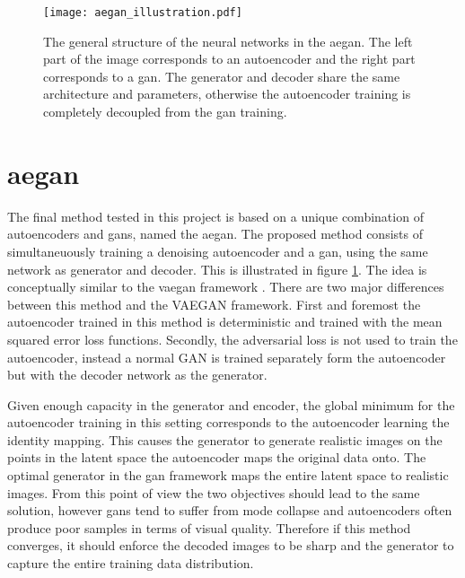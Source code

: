 \begin{figure}[t]
    \centering
    \texttt{[image: aegan\_illustration.pdf]}
    \caption{The general structure of the neural networks in the \acrlong{aegan}. The left part of the image corresponds to an autoencoder and the right part corresponds to a \acrshort{gan}. The generator and decoder share the same architecture and parameters, otherwise the autoencoder training is completely decoupled from the \acrshort{gan} training.}
    \label{fig:aegan}
\end{figure}

\section{\acrlong{aegan}}
The final method tested in this project is based on a unique combination of autoencoders and \acrshort{gans}, named the \acrfull{aegan}. The proposed method consists of simultaneuously training a denoising autoencoder and a \acrshort{gan}, using the same network as generator and decoder. This is illustrated in figure \ref{fig:aegan}. The idea is conceptually similar to the \acrshort{vaegan} framework \parencite{LarsenSW15autoencodingbeyond}. There are two major differences between this method and the VAEGAN framework. First and foremost the autoencoder trained in this method is deterministic and trained with the mean squared error loss functions. Secondly, the adversarial loss is not used to train the autoencoder, instead a normal GAN is trained separately form the autoencoder but with the decoder network as the generator. 

Given enough capacity in the generator and encoder, the global minimum for the autoencoder training in this setting corresponds to the autoencoder learning the identity mapping. This causes the generator to generate realistic images on the points in the latent space the autoencoder maps the original data onto. The optimal generator in the \acrshort{gan} framework maps the entire latent space to realistic images. From this point of view the two objectives should lead to the same solution, however \acrshort{gans} tend to suffer from mode collapse and autoencoders often produce poor samples in terms of visual quality. Therefore if this method converges, it should enforce the decoded images to be sharp and the generator to capture the entire training data distribution. 

